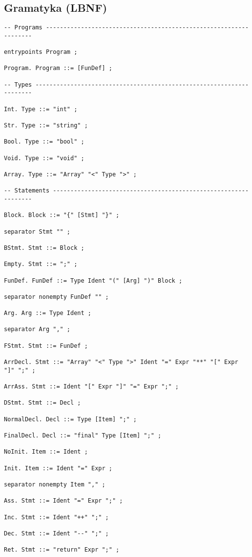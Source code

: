 \documentclass[a4paper]{article}
\begin{document}
\subsection*{Gramatyka (LBNF)}
\begin{lstlisting}
-- Programs ------------------------------------------------------------------

entrypoints Program ;

Program. Program ::= [FunDef] ;

-- Types ---------------------------------------------------------------------

Int. Type ::= "int" ;

Str. Type ::= "string" ;

Bool. Type ::= "bool" ;

Void. Type ::= "void" ;

Array. Type ::= "Array" "<" Type ">" ;

-- Statements ----------------------------------------------------------------

Block. Block ::= "{" [Stmt] "}" ;

separator Stmt "" ;

BStmt. Stmt ::= Block ;

Empty. Stmt ::= ";" ;

FunDef. FunDef ::= Type Ident "(" [Arg] ")" Block ;

separator nonempty FunDef "" ;

Arg. Arg ::= Type Ident ;

separator Arg "," ;

FStmt. Stmt ::= FunDef ;

ArrDecl. Stmt ::= "Array" "<" Type ">" Ident "=" Expr "**" "[" Expr "]" ";" ;

ArrAss. Stmt ::= Ident "[" Expr "]" "=" Expr ";" ;

DStmt. Stmt ::= Decl ;

NormalDecl. Decl ::= Type [Item] ";" ;

FinalDecl. Decl ::= "final" Type [Item] ";" ;

NoInit. Item ::= Ident ;

Init. Item ::= Ident "=" Expr ;

separator nonempty Item "," ;

Ass. Stmt ::= Ident "=" Expr ";" ;

Inc. Stmt ::= Ident "++" ";" ;

Dec. Stmt ::= Ident "--" ";" ;

Ret. Stmt ::= "return" Expr ";" ;


\end{lstlisting}
\end{document}
